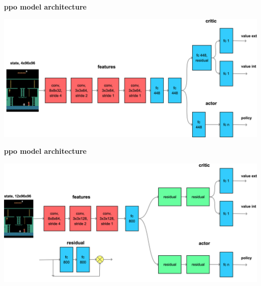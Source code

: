 \documentclass[xcolor=dvipsnames]{beamer}
\begin{document}
\begin{frame}{\bf ppo model architecture}

\centering
\includegraphics[scale=0.12]{../diagrams/rnd/modelppoa.png}

\end{frame}

\begin{frame}{\bf ppo model architecture}

\centering
\includegraphics[scale=0.1]{../diagrams/rnd/modelppob.png}

\end{frame}
\end{document}
